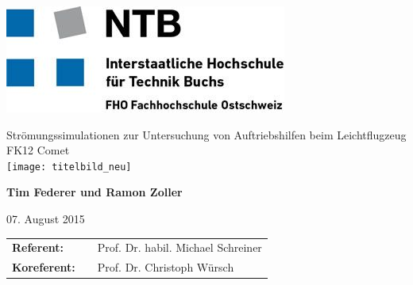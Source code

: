 %

\thispagestyle{empty}
\includegraphics[scale=0.5]{img/ntb.jpg}
%
\vspace{10mm}
\begin{center}
\LARGE{\textsf{
Strömungssimulationen zur Untersuchung von Auftriebshilfen beim Leichtflugzeug FK12 Comet\\
}}
%
\vspace{1cm}
\texttt{[image: titelbild\_neu]}
%
\end{center}
%
\begin{center}
\large{\textbf{Tim Federer und Ramon Zoller}} \\
\end{center}
%
\vspace{2mm}
%
\begin{center}
\large{07. August 2015}
\end{center}
%
\vspace{2mm}
%
%
\begin{center}
\begin{tabular}{lll}
\textbf{Referent:} & & Prof. Dr. habil. Michael Schreiner\\
\textbf{Koreferent:} & & Prof. Dr. Christoph Würsch\\
\end{tabular}
\end{center}
%
